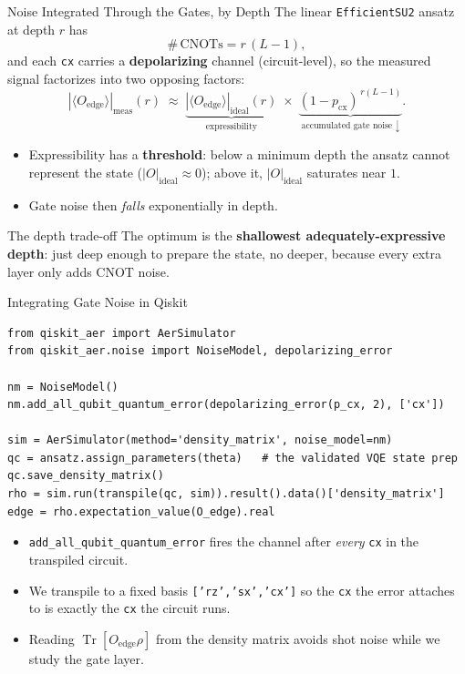 \documentclass[aspectratio=169,12pt]{beamer}
\newcommand{\Tr}{\operatorname{Tr}}
\begin{document}
\begin{frame}{Noise Integrated Through the Gates, by Depth}
  \small
  The linear \texttt{EfficientSU2} ansatz at depth $r$ has
  \[
    \#\,\text{CNOTs}=r\,(L-1),
  \]
  and each \texttt{cx} carries a \textbf{depolarizing} channel (circuit-level), so the measured signal factorizes into two opposing factors:
  \begin{equation}
    |\langle O_{\mathrm{edge}}\rangle|_{\mathrm{meas}}(r)
    \;\approx\;
    \underbrace{|\langle O_{\mathrm{edge}}\rangle|_{\mathrm{ideal}}(r)}_{\text{expressibility}}
    \;\times\;
    \underbrace{(1-p_{\mathrm{cx}})^{\,r(L-1)}}_{\text{accumulated gate noise }\downarrow}.
  \end{equation}
  \begin{itemize}
    \item Expressibility has a \textbf{threshold}: below a minimum depth the ansatz cannot represent the state ($|O|_{\mathrm{ideal}}\!\approx\!0$); above it, $|O|_{\mathrm{ideal}}$ saturates near $1$.
    \item Gate noise then \emph{falls} exponentially in depth.
  \end{itemize}
  \begin{block}{The depth trade-off}
    The optimum is the \textbf{shallowest adequately-expressive depth}: just deep enough to prepare the state, no deeper, because every extra layer only adds CNOT noise.
  \end{block}
\end{frame}

\begin{frame}[fragile]{Integrating Gate Noise in Qiskit}
  \begin{lstlisting}
from qiskit_aer import AerSimulator
from qiskit_aer.noise import NoiseModel, depolarizing_error

nm = NoiseModel()
nm.add_all_qubit_quantum_error(depolarizing_error(p_cx, 2), ['cx'])

sim = AerSimulator(method='density_matrix', noise_model=nm)
qc = ansatz.assign_parameters(theta)   # the validated VQE state prep
qc.save_density_matrix()
rho = sim.run(transpile(qc, sim)).result().data()['density_matrix']
edge = rho.expectation_value(O_edge).real
  \end{lstlisting}
  \begin{itemize}
    \item \texttt{add\_all\_qubit\_quantum\_error} fires the channel after \emph{every} \texttt{cx} in the transpiled circuit.
    \item We transpile to a fixed basis \texttt{['rz','sx','cx']} so the \texttt{cx} the error attaches to is exactly the \texttt{cx} the circuit runs.
    \item Reading $\Tr[O_{\mathrm{edge}}\rho]$ from the density matrix avoids shot noise while we study the gate layer.
  \end{itemize}
\end{frame}
\end{document}
